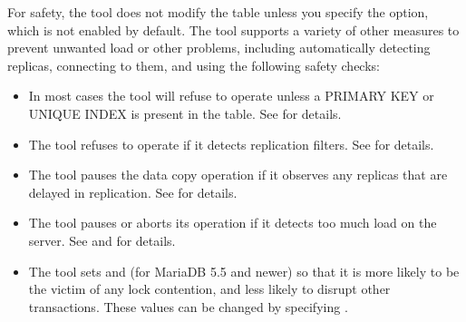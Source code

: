 \documentclass[letterpaper,10pt,english]{sphinxmanual}
\begin{document}
\sphinxAtStartPar
For safety, the tool does not modify the table unless you specify the
{\hyperref[\detokenize{mariadb-schema-change:cmdoption-mariadb-schema-change-execute}]{}} option, which is not enabled by default.  The tool supports a
variety of other measures to prevent unwanted load or other problems, including
automatically detecting replicas, connecting to them, and using the following
safety checks:
\begin{itemize}
\item {} 
\sphinxAtStartPar
In most cases the tool will refuse to operate unless a PRIMARY KEY or UNIQUE INDEX is
present in the table. See {\hyperref[\detokenize{mariadb-schema-change:cmdoption-mariadb-schema-change-alter}]{}} for details.

\item {} 
\sphinxAtStartPar
The tool refuses to operate if it detects replication filters. See
{\hyperref[\detokenize{mariadb-schema-change:cmdoption-mariadb-schema-change-no-check-replication-filters}]{}} for details.

\item {} 
\sphinxAtStartPar
The tool pauses the data copy operation if it observes any replicas that are
delayed in replication. See {\hyperref[\detokenize{mariadb-schema-change:cmdoption-mariadb-schema-change-max-lag}]{}} for details.

\item {} 
\sphinxAtStartPar
The tool pauses or aborts its operation if it detects too much load on the
server. See {\hyperref[\detokenize{mariadb-schema-change:cmdoption-mariadb-schema-change-max-load}]{}} and {\hyperref[\detokenize{mariadb-schema-change:cmdoption-mariadb-schema-change-critical-load}]{}} for details.

\item {} 
\sphinxAtStartPar
The tool sets  and (for MariaDB 5.5 and newer)
 so that it is more likely to be the victim of any
lock contention, and less likely to disrupt other transactions.  These
values can be changed by specifying {\hyperref[\detokenize{mariadb-schema-change:cmdoption-mariadb-schema-change-set-vars}]{}}.


\end{itemize}
\end{document}
